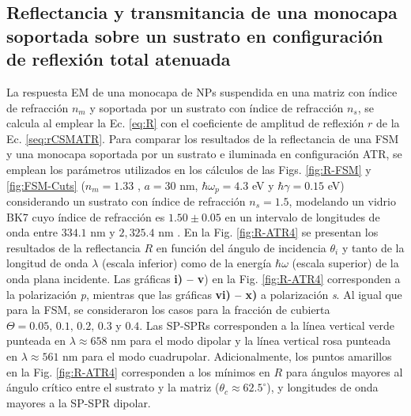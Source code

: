 	\subsection{Reflectancia y transmitancia de una monocapa soportada sobre un sustrato en configuración de reflexión total atenuada}
	\label{ssection:DrudeATR}

La respuesta EM de una monocapa de NPs suspendida en una matriz con índice de refracción $n_m$ y soportada por un sustrato con índice de refracción $n_s$, se calcula al emplear la Ec.  \eqref{eq:R} con el coeficiente de amplitud de reflexión $r$ de la Ec.  \eqref{seq:rCSMATR}. Para comparar los resultados de la reflectancia de una FSM y una monocapa soportada por un sustrato e iluminada en configuración ATR, se emplean los parámetros utilizados en los cálculos de las Figs. \ref{fig:R-FSM} y \ref{fig:FSM-Cuts} ($n_m=1.33$ , $a=30$ nm, $\hbar\omega_p=4.3$ eV y  $\hbar\gamma = 0.15$ eV) considerando un sustrato con índice de refracción $n_s=1.5$, modelando un vidrio BK7 cuyo índice de refracción es $1.50\pm 0.05$ en un intervalo de longitudes de onda entre $334.1$ nm y $2,325.4$ nm \cite{schott2019datasheet}. En la Fig.  \ref{fig:R-ATR4} se presentan los resultados de la reflectancia $R$ en función del ángulo de incidencia $\theta_i$ y tanto de la longitud de onda $\lambda$ (escala inferior) como de la energía $\hbar\omega$ (escala superior)  de la onda plana incidente. Las gráficas \textbf{i) -- v}) en la Fig. \ref{fig:R-ATR4}  corresponden a la polarización \emph{p}, mientras que las gráficas \textbf{vi) -- x)} a polarización \emph{s}. Al igual que para la FSM, se consideraron los casos para la fracción de cubierta $\Theta = 0.05,\,0.1,\,0.2,\,0.3$ y $0.4$. Las SP-SPRs corresponden a la línea vertical verde punteada en $\lambda \approx 658$ nm para el modo dipolar y la línea vertical rosa punteada en  $\lambda \approx 561$ nm para el modo cuadrupolar. Adicionalmente, los puntos amarillos en la Fig. \ref{fig:R-ATR4} corresponden a los mínimos en $R$ para ángulos mayores al ángulo crítico entre el sustrato y la matriz ($\theta_c\approx 62.5^\circ$), y longitudes de onda mayores a la SP-SPR dipolar.

